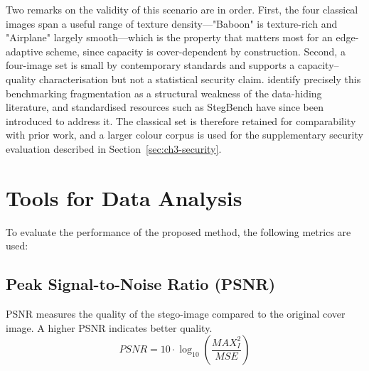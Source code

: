 Two remarks on the validity of this scenario are in order. First, the four classical images span a useful range of texture density---"Baboon" is texture-rich and "Airplane" largely smooth---which is the property that matters most for an edge-adaptive scheme, since capacity is cover-dependent by construction. Second, a four-image set is small by contemporary standards and supports a capacity--quality characterisation but not a statistical security claim. \citet{janok2026survey} identify precisely this benchmarking fragmentation as a structural weakness of the data-hiding literature, and standardised resources such as StegBench \citep{andone2026stegbench} have since been introduced to address it. The classical set is therefore retained for comparability with prior work, and a larger colour corpus is used for the supplementary security evaluation described in Section~\ref{sec:ch3-security}.

\section{Tools for Data Analysis}
To evaluate the performance of the proposed method, the following metrics are used:

\subsection{Peak Signal-to-Noise Ratio (PSNR)}
PSNR measures the quality of the stego-image compared to the original cover image. A higher PSNR indicates better quality.
\begin{equation}
    PSNR = 10 \cdot \log_{10} \left( \frac{MAX_I^2}{MSE} \right)
\end{equation}

